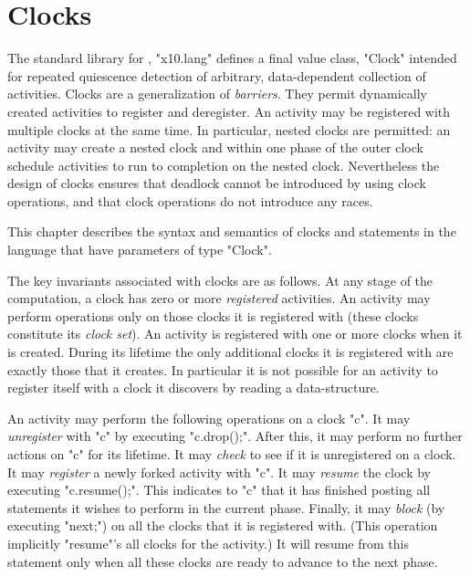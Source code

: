 \chapter{Clocks}\label{XtenClocks}

The standard library for \Xten{}, \xcd"x10.lang" defines a
final value class, \xcd"Clock" intended for repeated quiescence detection
of arbitrary, data-dependent collection of activities. Clocks are a
generalization of {\em barriers}. They permit dynamically created
activities to register and deregister. An activity may be registered
with multiple clocks at the same time. In particular, nested clocks
are permitted: an activity may create a nested clock and within one
phase of the outer clock schedule activities to run to completion on
the nested clock.  Nevertheless the design of clocks ensures that
deadlock cannot be introduced by using clock operations, and that
clock operations do not introduce any races.

This chapter describes the syntax and semantics of clocks and
statements in the language that have parameters of type \xcd"Clock". 

The key invariants associated with clocks are as follows.  At any
stage of the computation, a clock has zero or more {\em registered}
activities. An activity may perform operations only on those clocks it
is registered with (these clocks constitute its {\em clock set}).  An
activity is registered with one or more clocks when it is created.
During its lifetime the only additional clocks it is registered with
are exactly those that it creates. In particular it is not possible
for an activity to register itself with a clock it discovers by
reading a data-structure.

An activity may perform the following operations on a clock \xcd"c".
It may {\em unregister} with \xcd"c" by executing \xcd"c.drop();".
After this, it may perform no further actions on \xcd"c"
for its lifetime. It may {\em check} to see if it is unregistered on a
clock. It may {\em register} a newly forked activity with \xcd"c".
It may {\em resume} the clock by executing \xcd"c.resume();". This
indicates to \xcd"c" that it has finished posting all statements it
wishes to perform in the current phase. Finally, it may {\em block}
(by executing \xcd"next;") on all the clocks that it is registered
with. (This operation implicitly \xcd"resume"'s all clocks for the
activity.) It will resume from this statement only when all these
clocks are ready to advance to the next phase.

